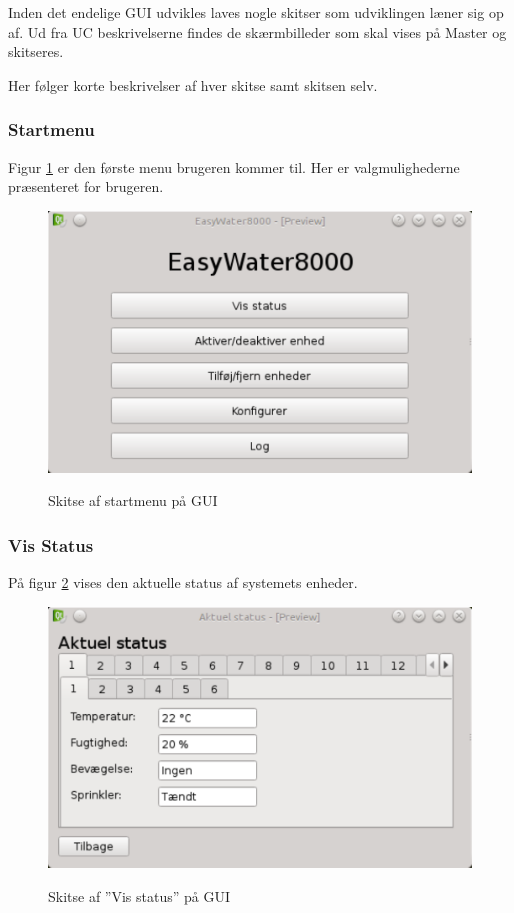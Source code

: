 
Inden det endelige GUI udvikles laves nogle skitser som udviklingen læner sig op af. Ud fra UC beskrivelserne findes de skærmbilleder som skal vises på Master og skitseres.

Her følger korte beskrivelser af hver skitse samt skitsen selv.

\subsubsection{Startmenu}
Figur \ref{fig:GUI-Startmenu} er den første menu brugeren kommer til. Her er valgmulighederne præsenteret for brugeren.

\begin{figure}[htbp] \centering
{\includegraphics[scale=0.5]{filer/pics/GUI/Start-menu}}
\caption{Skitse af startmenu på GUI}
\label{fig:GUI-Startmenu}
\end{figure}

\subsubsection{Vis Status}
På figur \ref{fig:GUI-aktuel-status} vises den aktuelle status af systemets enheder.

\begin{figure}[htbp] \centering
{\includegraphics[scale=0.5]{filer/pics/GUI/Aktuel-status}}
\caption{Skitse af ''Vis status'' på GUI}
\label{fig:GUI-aktuel-status}
\end{figure}

